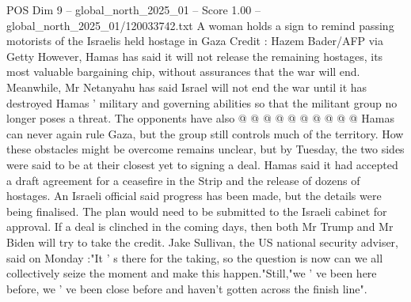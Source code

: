 \begin{textsample}{POS Dim 9 – global\_north\_2025\_01 – Score 1.00 – global\_north\_2025\_01/120033742.txt}
A woman holds a sign to remind passing motorists of the Israelis held hostage in Gaza Credit : Hazem Bader/AFP via Getty However, Hamas has said it will not release the remaining hostages, its most valuable bargaining chip, without assurances that the war will end.
Meanwhile, Mr Netanyahu has said Israel will not end the war until it has destroyed Hamas ' military and governing abilities so that the militant group no longer poses a threat.
The opponents have also @ @ @ @ @ @ @ @ @ @ Hamas can never again rule Gaza, but the group still controls much of the territory.
How these obstacles might be overcome remains unclear, but by Tuesday, the two sides were said to be at their closest yet to signing a deal.
Hamas said it had accepted a draft agreement for a ceasefire in the Strip and the release of dozens of hostages.
An Israeli official said progress has been made, but the details were being finalised.
The plan would need to be submitted to the Israeli cabinet for approval.
If a deal is clinched in the coming days, then both Mr Trump and Mr Biden will try to take the credit.
Jake Sullivan, the US national security adviser, said on Monday :"It ' s there for the taking, so the question is now can we all collectively seize the moment and make this happen."Still,"we ' ve been here before, we ' ve been close before and haven't gotten across the finish line".

\end{textsample}
